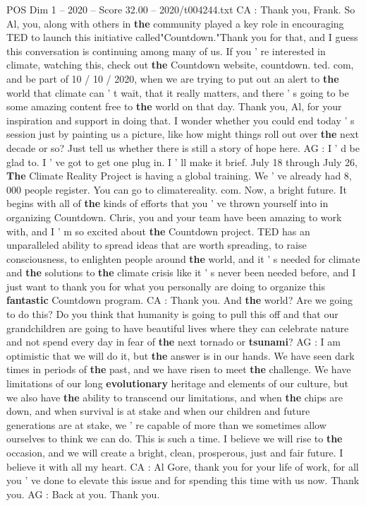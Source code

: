 \begin{textsample}{POS Dim 1 – 2020 – Score 32.00 – 2020/t004244.txt}
CA : Thank you, Frank.
So Al, you, along with others in \textbf{the} community played a key role in encouraging TED to launch this initiative called"Countdown."Thank you for that, and I guess this conversation is continuing among many of us.
If you ' re interested in climate, watching this, check out \textbf{the} Countdown website, countdown. ted. com, and be part of 10 / 10 / 2020, when we are trying to put out an alert to \textbf{the} world that climate can ' t wait, that it really matters, and there ' s going to be some amazing content free to \textbf{the} world on that day.
Thank you, Al, for your inspiration and support in doing that.
I wonder whether you could end today ' s session just by painting us a picture, like how might things roll out over \textbf{the} next decade or so?
Just tell us whether there is still a story of hope here.
AG : I ' d be glad to.
I ' ve got to get one plug in.
I ' ll make it brief.
July 18 through July 26, \textbf{The} Climate Reality Project is having a global training.
We ' ve already had 8, 000 people register.
You can go to climatereality. com.
Now, a bright future.
It begins with all of \textbf{the} kinds of efforts that you ' ve thrown yourself into in organizing Countdown.
Chris, you and your team have been amazing to work with, and I ' m so excited about \textbf{the} Countdown project.
TED has an unparalleled ability to spread ideas that are worth spreading, to raise consciousness, to enlighten people around \textbf{the} world, and it ' s needed for climate and \textbf{the} solutions to \textbf{the} climate crisis like it ' s never been needed before, and I just want to thank you for what you personally are doing to organize this \textbf{fantastic} Countdown program.
CA : Thank you.
And \textbf{the} world?
Are we going to do this?
Do you think that humanity is going to pull this off and that our grandchildren are going to have beautiful lives where they can celebrate nature and not spend every day in fear of \textbf{the} next tornado or \textbf{tsunami}?
AG : I am optimistic that we will do it, but \textbf{the} answer is in our hands.
We have seen dark times in periods of \textbf{the} past, and we have risen to meet \textbf{the} challenge.
We have limitations of our long \textbf{evolutionary} heritage and elements of our culture, but we also have \textbf{the} ability to transcend our limitations, and when \textbf{the} chips are down, and when survival is at stake and when our children and future generations are at stake, we ' re capable of more than we sometimes allow ourselves to think we can do.
This is such a time.
I believe we will rise to \textbf{the} occasion, and we will create a bright, clean, prosperous, just and fair future.
I believe it with all my heart.
CA : Al Gore, thank you for your life of work, for all you ' ve done to elevate this issue and for spending this time with us now.
Thank you.
AG : Back at you.
Thank you.

\end{textsample}
